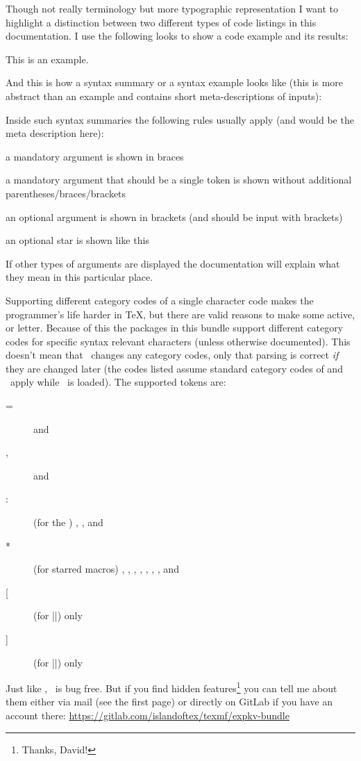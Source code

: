 Though not really terminology but more typographic representation I want to
highlight a distinction between two different types of code listings in this
documentation. I use the following looks to show a code example and its results:
\begin{enverb}[same-line=0.6]
  \newcommand*\foo{This is an example.}
  \foo
\end{enverb}
And this is how a syntax summary or a syntax example looks like (this is more
abstract than an example and contains short meta-descriptions of inputs):
\begin{syntaxexample}
\end{syntaxexample}
Inside such syntax summaries the following rules usually apply (and 
would be the meta description here):
\begin{description}[font=\small\ttfamily]
  \item[\marg{arg}]
    a mandatory argument is shown in braces
  \item[\meta{arg}]
    a mandatory argument that should be a single token is shown without
    additional parentheses/braces/brackets
  \item[\oarg{arg}]
    an optional argument is shown in brackets (and should be input with
    brackets)
  \item[\meta{*}]
    an optional star is shown like this
\end{description}
If other types of arguments are displayed the documentation will explain what
they mean in this particular place.

Supporting different category codes of a single character code makes the
programmer's life harder in \TeX, but there are valid reasons to make some
active, or letter. Because of this the packages in this bundle support different
category codes for specific syntax relevant characters (unless otherwise
documented). This doesn't mean that \expkv\ changes any category codes, only
that parsing is correct \emph{if} they are changed later (the codes listed
assume standard category codes of  and \LaTeXe\ apply while
\expkv\ is loaded). The supported tokens are:
\begin{description}
  \item[=]  and 
  \item[,]  and 
  \item[:] (for the \expnotation) , , and 
  \item[*] (for starred macros) , , , ,
    , , , and 
  \item[{[}] (for |\ekvoptarg|) only \tkn{[}{12}
  \item[{]}] (for |\ekvoptarg|) only \tkn{]}{12}
\end{description}

Just like , \expkv\ is bug free. But if you find hidden
features\footnote{Thanks, David!} you can tell me about them either via mail
(see the first page) or directly on GitLab if you have an account there:
\url{https://gitlab.com/islandoftex/texmf/expkv-bundle}
